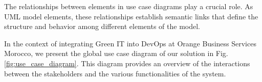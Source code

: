 The relationships between elements in use case diagrams play a crucial role. As UML model elements, these relationships establish semantic links that define the structure and behavior among different elements of the model.

In the context of integrating Green IT into DevOps at Orange Business Services Morocco, we present the global use case diagram of our solution in Fig. \ref{fig:use_case_diagram}. This diagram provides an overview of the interactions between the stakeholders and the various functionalities of the system.




\section{}



















